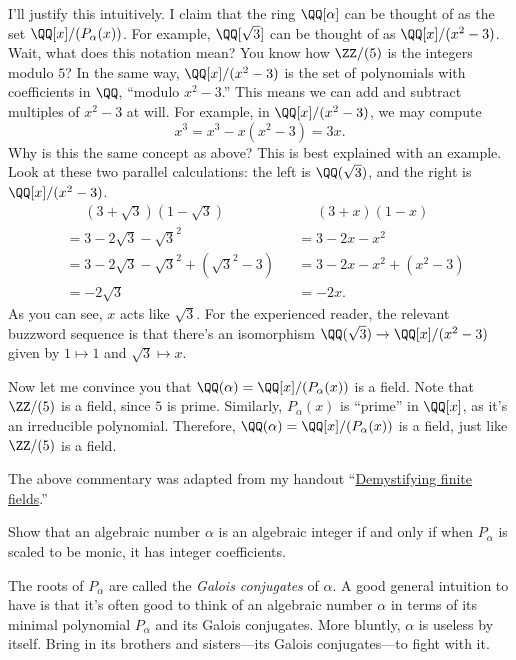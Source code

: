 \documentclass[11pt]{scrartcl}
\begin{document}
I'll justify this intuitively. I claim that the ring $\QQ[\alpha]$ can be thought of as the set $\QQ[x]/(P_\alpha(x))$.
For example, $\QQ[\sqrt3]$ can be thought of as $\QQ[x]/(x^2 - 3)$.
Wait, what does this notation mean? You know how $\ZZ/(5)$ is the integers modulo $5$?
In the same way, $\QQ[x]/(x^2 - 3)$ is the set of polynomials with coefficients in $\QQ$,
``modulo $x^2 - 3$.'' This means we can add and subtract multiples of $x^2 - 3$ at will.
For example, in $\QQ[x]/(x^2 - 3)$, we may compute
\[x^3 = x^3 - x(x^2 - 3) = 3x.\]
Why is this the same concept as above? This is best explained with an example.
Look at these two parallel calculations:
the left is $\QQ(\sqrt3)$, and the right is $\QQ[x]/(x^2 - 3)$.
\begin{align*}
	&\phantom{=}(3 + \sqrt3)(1 - \sqrt3) & &\phantom{=} (3 + x)(1 - x)\\
	&= 3 - 2\sqrt3 - \sqrt3^2 & &= 3 - 2x - x^2 \\
	&= 3 - 2\sqrt3 - \sqrt3^2 + (\sqrt3^2 - 3) & &= 3 - 2x - x^2 + (x^2 - 3) \\
	&= -2\sqrt3 & &= -2x.
\end{align*}
As you can see, $x$ acts like $\sqrt3$.
For the experienced reader, the relevant buzzword sequence is that
there's an isomorphism $\QQ(\sqrt3) \to \QQ[x]/(x^2 - 3)$
given by $1 \mapsto 1$ and $\sqrt3 \mapsto x$.

Now let me convince you that $\QQ(\alpha) = \QQ[x]/(P_\alpha(x))$ is a field.
Note that $\ZZ/(5)$ is a field, since $5$ is prime.
Similarly, $P_\alpha(x)$ is ``prime'' in $\QQ[x]$, as it's an irreducible polynomial.
Therefore, $\QQ(\alpha) = \QQ[x]/(P_\alpha(x))$ is a field, just like $\ZZ/(5)$ is a field.

\begin{remark*}
	The above commentary was adapted from my handout
	``\href{https://knowingant.github.io/handouts/finite-fields/finite-fields.pdf}
	{Demystifying finite fields}.''
\end{remark*}

\begin{exercise} 
	Show that an algebraic number $\alpha$ is an algebraic integer if and only if
	when $P_\alpha$ is scaled to be monic, it has integer coefficients.
\end{exercise}

The roots of $P_\alpha$ are called the \emph{Galois conjugates} of $\alpha$.
A good general intuition to have is that it's often good to think
of an algebraic number $\alpha$ in terms of its minimal polynomial $P_\alpha$
and its Galois conjugates.
More bluntly, $\alpha$ is useless by itself. Bring in its brothers and sisters---its Galois conjugates---to fight with it.
\end{document}
